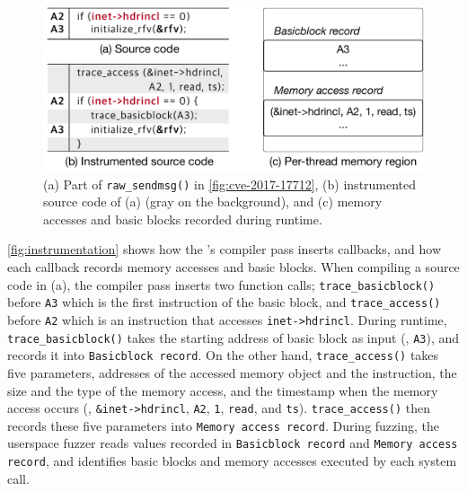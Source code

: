 \begin{figure}
  \centering
  \includegraphics[width=0.9\linewidth]{fig/instrumentation.pdf}
  \caption{(a) Part of \texttt{raw_sendmsg()} in
    \autoref{fig:cve-2017-17712}, (b) instrumented source code of (a)
    (gray on the background), and (c) memory accesses and basic blocks
    recorded during runtime.}
  \label{fig:instrumentation}
  \vspace{-5pt}
\end{figure}

\autoref{fig:instrumentation} shows how the \sys's compiler pass
inserts callbacks, and how each callback records memory accesses and
basic blocks.
%
When compiling a source code in (a), the compiler pass inserts two
function calls; \texttt{trace_basicblock()} before \texttt{A3} which
is the first instruction of the basic block, and
\texttt{trace_access()} before \texttt{A2} which is an instruction
that accesses \texttt{inet->hdrincl}.
%
During runtime, \texttt{trace_basicblock()} takes the starting address
of basic block as input (\ie, \texttt{A3}), and records it into
\texttt{Basicblock record}.
%
On the other hand, \texttt{trace_access()} takes five parameters,
addresses of the accessed memory object and the instruction, the size
and the type of the memory access, and the timestamp when the memory
access occurs (\ie, \texttt{\&inet->hdrincl}, \texttt{A2}, \texttt{1},
\texttt{read}, and \texttt{ts}).
%
\texttt{trace_access()} then records these five parameters into
\texttt{Memory access record}.
%
During fuzzing, the userspace fuzzer reads values recorded in
\texttt{Basicblock record} and \texttt{Memory access record}, and
identifies basic blocks and memory accesses executed by each system
call.












